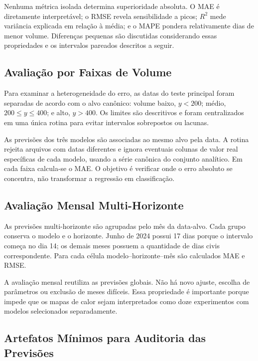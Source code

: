 Nenhuma métrica isolada determina superioridade absoluta. O MAE é diretamente interpretável; o RMSE revela sensibilidade a picos; $R^2$ mede variância explicada em relação à média; e o MAPE pondera relativamente dias de menor volume. Diferenças pequenas são discutidas considerando essas propriedades e os intervalos pareados descritos a seguir.



\subsection{Avaliação por Faixas de Volume}

Para examinar a heterogeneidade do erro, as datas do teste principal foram separadas de acordo com o alvo canônico: volume baixo, $y<200$; médio, $200\leq y\leq400$; e alto, $y>400$. Os limites são descritivos e foram centralizados em uma única rotina para evitar intervalos sobrepostos ou lacunas.

As previsões dos três modelos são associadas ao mesmo alvo pela data. A rotina rejeita arquivos com datas diferentes e ignora eventuais colunas de valor real específicas de cada modelo, usando a série canônica do conjunto analítico. Em cada faixa calcula-se o MAE. O objetivo é verificar onde o erro absoluto se concentra, não transformar a regressão em classificação.

\subsection{Avaliação Mensal Multi-Horizonte}

As previsões multi-horizonte são agrupadas pelo mês da data-alvo. Cada grupo conserva o modelo e o horizonte. Junho de 2024 possui 17 dias porque o intervalo começa no dia 14; os demais meses possuem a quantidade de dias civis correspondente. Para cada célula modelo--horizonte--mês são calculados MAE e RMSE.

A avaliação mensal reutiliza as previsões globais. Não há novo ajuste, escolha de parâmetros ou exclusão de meses difíceis. Essa propriedade é importante porque impede que os mapas de calor sejam interpretados como doze experimentos com modelos selecionados separadamente.

\subsection{Artefatos Mínimos para Auditoria das Previsões}

